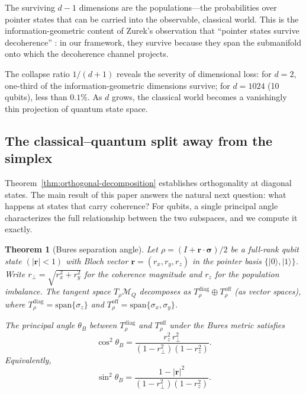 \documentclass[12pt,a4paper]{article}
\newtheorem{theorem}{Theorem}[section]
\theoremstyle{definition}
\theoremstyle{remark}
\begin{document}
The surviving $d - 1$ dimensions are the populations---the probabilities over pointer states that can be carried into the observable, classical world. This is the information-geometric content of Zurek's observation that ``pointer states survive decoherence'' \cite{zurek2003decoherence}: in our framework, they survive because they span the submanifold onto which the decoherence channel projects.

The collapse ratio $1/(d+1)$ reveals the severity of dimensional loss: for $d = 2$, one-third of the information-geometric dimensions survive; for $d = 1024$ (10 qubits), less than $0.1\%$. As $d$ grows, the classical world becomes a vanishingly thin projection of quantum state space.

\subsection{The classical--quantum split away from the simplex}
\label{sec:bures-angle}

Theorem~\ref{thm:orthogonal-decomposition} establishes orthogonality at diagonal states.  The main result of this paper answers the natural next question: what happens at states that carry coherence?  For qubits, a single principal angle characterizes the full relationship between the two subspaces, and we compute it exactly.

\begin{theorem}[Bures separation angle]
\label{thm:bures-angle}
Let $\rho = (I + \mathbf{r} \cdot \boldsymbol{\sigma})/2$ be a full-rank qubit state $(|\mathbf{r}| < 1)$ with Bloch vector $\mathbf{r} = (r_x, r_y, r_z)$ in the pointer basis $\{|0\rangle, |1\rangle\}$.  Write $r_\perp = \sqrt{r_x^2 + r_y^2}$ for the coherence magnitude and $r_z$ for the population imbalance.  The tangent space $T_\rho \mathcal{M}_Q$ decomposes as $T_\rho^{\mathrm{diag}} \oplus T_\rho^{\mathrm{off}}$ (as vector spaces), where $T_\rho^{\mathrm{diag}} = \mathrm{span}\{\sigma_z\}$ and $T_\rho^{\mathrm{off}} = \mathrm{span}\{\sigma_x, \sigma_y\}$.

The principal angle $\theta_B$ between $T_\rho^{\mathrm{diag}}$ and $T_\rho^{\mathrm{off}}$ under the Bures metric satisfies
\begin{equation}
\label{eq:bures-angle}
\cos^2 \theta_B = \frac{r_z^2\, r_\perp^2}{(1 - r_\perp^2)(1 - r_z^2)}.
\end{equation}
Equivalently,
\begin{equation}
\label{eq:bures-angle-sin}
\sin^2 \theta_B = \frac{1 - |\mathbf{r}|^2}{(1 - r_\perp^2)(1 - r_z^2)}.
\end{equation}
\end{theorem}
\end{document}
